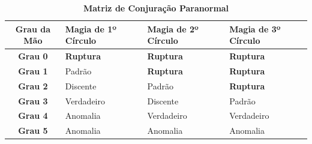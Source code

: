 \documentclass[a4paper,11pt,openany]{book}
\begin{document}
\begin{table}[t]
\centering
\sffamily
\renewcommand{\arraystretch}{1.4}
\begin{tabularx}{\textwidth}{c X X X}
\toprule
\textbf{Grau da Mão} & \textbf{Magia de 1º Círculo} & \textbf{Magia de 2º Círculo} & \textbf{Magia de 3º Círculo} \\
\midrule
\textbf{Grau 0} & \textcolor{CodexRed}{\textbf{\sffamily\bfseries Ruptura}} & \textcolor{CodexRed}{\textbf{\sffamily\bfseries Ruptura}} & \textcolor{CodexRed}{\textbf{\sffamily\bfseries Ruptura}} \\
\textbf{Grau 1} & Padrão & \textcolor{CodexRed}{\textbf{\sffamily\bfseries Ruptura}} & \textcolor{CodexRed}{\textbf{\sffamily\bfseries Ruptura}} \\
\textbf{Grau 2} & Discente & Padrão & \textcolor{CodexRed}{\textbf{\sffamily\bfseries Ruptura}} \\
\textbf{Grau 3} & Verdadeiro & Discente & Padrão \\
\textbf{Grau 4} & Anomalia & Verdadeiro & Verdadeiro \\
\textbf{Grau 5} & Anomalia & Anomalia & Anomalia \\
\bottomrule
\end{tabularx}
\caption{\textbf{Matriz de Conjuração Paranormal}}
\end{table}
\end{document}
